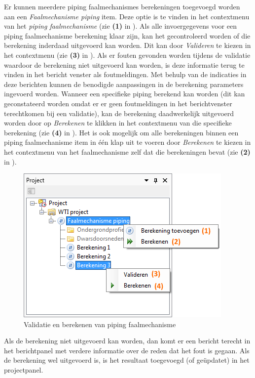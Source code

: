 Er kunnen meerdere piping faalmechanismes berekeningen toegevoegd worden aan een \textit{Faalmechanisme piping} item. Deze optie is te vinden in het contextmenu van het \textit{piping faalmechanisme} (zie \textbf{(1)} in ).
Als alle invoergegevens voor een piping faalmechanisme berekening klaar zijn, kan het gecontroleerd worden of die berekening inderdaad uitgevoerd kan worden. Dit kan door \textit{Valideren} te kiezen in het contextmenu (zie \textbf{(3)} in ). Als er fouten gevonden worden tijdens de validatie waardoor de berekening niet uitgevoerd kan worden, is deze informatie terug te vinden in het bericht venster als foutmeldingen. Met behulp van de indicaties in deze berichten kunnen de benodigde aanpassingen in de berekening parameters ingevoerd worden. 
Wanneer een specifieke piping berekend kan worden (dit kan geconstateerd worden omdat er er geen foutmeldingen in het berichtvenster terechtkomen bij een validatie), kan de berekening daadwerkelijk uitgevoerd worden door op \textit{Berekenen} te klikken in het contextmenu van die specifieke berekening (zie \textbf{(4)} in ).
Het is ook mogelijk om alle berekeningen binnen een piping faalmechanisme item in één klap uit te voeren door \textit{Berekenen} te kiezen in het contextmenu van het faalmechanisme zelf dat die berekeningen bevat (zie \textbf{(2)} in ).

\begin{figure} [H]
	\centering
		\includegraphics{figures/chapter_piping/validateAndRunPiping}
	\caption{Validatie en berekenen van piping faalmechanisme}
	\label{fig:piping.validateAndRunPiping}
\end{figure}


Als de berekening niet uitgevoerd kan worden, dan komt er een bericht terecht in het berichtpanel met verdere informatie over de reden dat het fout is gegaan. Als de berekening wel uitgevoerd is, is het resultaat toegevoegd (of ge\"{u}pdatet) in het projectpanel.





